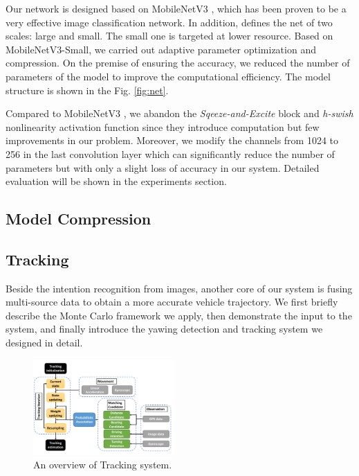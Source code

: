 \documentclass[journal]{IEEEtran}
\begin{document}

Our network is designed based on MobileNetV3 \cite{mobilenetv3}, which has been proven to be a very effective image classification network. 
In addition, \cite{mobilenetv3} defines the net of two scales: large and small. The small one is targeted at lower resource. Based on MobileNetV3-Small, we carried out adaptive parameter optimization and compression. On the premise of ensuring the accuracy, we reduced the number of parameters of the model to improve the computational efficiency. The model structure is shown in the Fig. \ref{fig:net}.

Compared to MobileNetV3 \cite{mobilenetv3}, we abandon the \textit{Sqeeze-and-Excite} \cite{hu2018squeeze} block and \textit{h-swish} nonlinearity activation function since they introduce computation but few improvements in our problem.  
Moreover, we modify the channels from 1024 to 256 in the last convolution layer which can significantly reduce the number of parameters but with only a slight loss of accuracy in our system. Detailed evaluation will be shown in the experiments section.
\subsection{Model Compression}\label{sec:pruning}

\subsection{Tracking}\label{sec:tracking}
Beside the intention recognition from images, another core of our system is fusing multi-source data\cite{hostettler2014vehicle} to obtain a more accurate vehicle trajectory. We first briefly describe the Monte Carlo framework we apply, then demonstrate the input to the system, and finally introduce the yawing detection and tracking system we designed in detail.

\begin{figure}[htbp]
    \centerline{\includegraphics[width=0.48\textwidth]{fig/PF-Systemoverall.pdf}}
    \caption{An overview of Tracking system.}
    \label{fig:track_system}
\end{figure}
\end{document}
